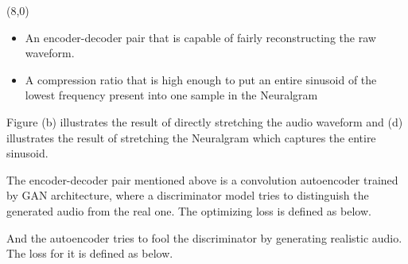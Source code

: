 \documentclass{article}
\begin{document}
\begin{textblock}{7.0}(8,0)
\Large
\begin{itemize}[topsep=-2em]
  \item{An encoder-decoder pair that is capable of fairly reconstructing the raw waveform.}
  \item{A compression ratio that is high enough to put an entire sinusoid of the lowest frequency present into one sample in the Neuralgram}
\end{itemize}
\vspace{1.5em}
Figure (b) illustrates the result of directly stretching the audio waveform and (d) illustrates the result of stretching the Neuralgram which captures the entire sinusoid.
\large 

\Large
The encoder-decoder pair mentioned above is a convolution autoencoder trained by GAN architecture, where a discriminator model tries to distinguish the generated audio from the real one. The optimizing loss is defined as below.

And the autoencoder tries to fool the discriminator by generating realistic audio. The loss for it is defined as below.



\medskip

 \\

\medskip
{} \\
\end{textblock}
\end{document}
